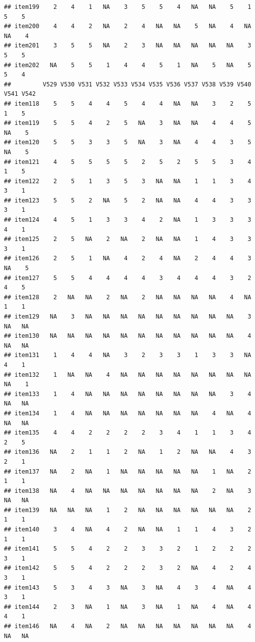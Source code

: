 \documentclass[
  man]{apa6}
\begin{document}
\begin{verbatim}
## item199    2    4    1   NA    3    5    5    4   NA   NA    5    1    5    5
## item200    4    4    2   NA    2    4   NA   NA    5   NA    4   NA   NA    4
## item201    3    5    5   NA    2    3   NA   NA   NA   NA   NA    3    5    5
## item202   NA    5    5    1    4    4    5    1   NA    5   NA    5    5    4
##         V529 V530 V531 V532 V533 V534 V535 V536 V537 V538 V539 V540 V541 V542
## item118    5    5    4    4    5    4    4   NA   NA    3    2    5    1    5
## item119    5    5    4    2    5   NA    3   NA   NA    4    4    5   NA    5
## item120    5    5    3    3    5   NA    3   NA    4    4    3    5   NA    5
## item121    4    5    5    5    5    2    5    2    5    5    3    4    1    5
## item122    2    5    1    3    5    3   NA   NA    1    1    3    4    3    1
## item123    5    5    2   NA    5    2   NA   NA    4    4    3    3    3    1
## item124    4    5    1    3    3    4    2   NA    1    3    3    3    4    1
## item125    2    5   NA    2   NA    2   NA   NA    1    4    3    3    3    1
## item126    2    5    1   NA    4    2    4   NA    2    4    4    3   NA    5
## item127    5    5    4    4    4    4    3    4    4    4    3    2    4    5
## item128    2   NA   NA    2   NA    2   NA   NA   NA   NA    4   NA    1    1
## item129   NA    3   NA   NA   NA   NA   NA   NA   NA   NA   NA    3   NA   NA
## item130   NA   NA   NA   NA   NA   NA   NA   NA   NA   NA   NA    4   NA   NA
## item131    1    4    4   NA    3    2    3    3    1    3    3   NA    4    1
## item132    1   NA   NA    4   NA   NA   NA   NA   NA   NA   NA   NA   NA    1
## item133    1    4   NA   NA   NA   NA   NA   NA   NA   NA    3    4   NA   NA
## item134    1    4   NA   NA   NA   NA   NA   NA   NA    4   NA    4   NA   NA
## item135    4    4    2    2    2    2    3    4    1    1    3    4    2    5
## item136   NA    2    1    1    2   NA    1    2   NA   NA    4    3    2    1
## item137   NA    2   NA    1   NA   NA   NA   NA   NA    1   NA    2    1    1
## item138   NA    4   NA   NA   NA   NA   NA   NA   NA    2   NA    3   NA   NA
## item139   NA   NA   NA    1    2   NA   NA   NA   NA   NA   NA    2    1    1
## item140    3    4   NA    4    2   NA   NA    1    1    4    3    2    1    1
## item141    5    5    4    2    2    3    3    2    1    2    2    2    3    1
## item142    5    5    4    2    2    2    3    2   NA    4    2    4    3    1
## item143    5    3    4    3   NA    3   NA    4    3    4   NA    4    3    1
## item144    2    3   NA    1   NA    3   NA    1   NA    4   NA    4    4    1
## item146   NA    4   NA    2   NA   NA   NA   NA   NA   NA   NA    4   NA   NA

\end{verbatim}
\end{document}
